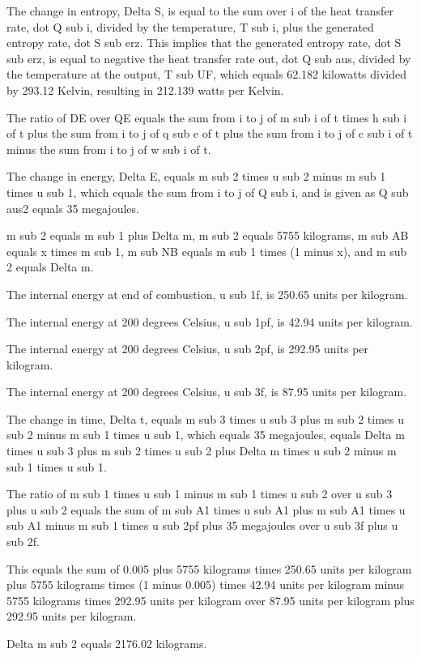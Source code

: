 The change in entropy, Delta S, is equal to the sum over i of the heat transfer rate, dot Q sub i, divided by the temperature, T sub i, plus the generated entropy rate, dot S sub erz. This implies that the generated entropy rate, dot S sub erz, is equal to negative the heat transfer rate out, dot Q sub aus, divided by the temperature at the output, T sub UF, which equals 62.182 kilowatts divided by 293.12 Kelvin, resulting in 212.139 watts per Kelvin.

The ratio of DE over QE equals the sum from i to j of m sub i of t times h sub i of t plus the sum from i to j of q sub e of t plus the sum from i to j of c sub i of t minus the sum from i to j of w sub i of t.

The change in energy, Delta E, equals m sub 2 times u sub 2 minus m sub 1 times u sub 1, which equals the sum from i to j of Q sub i, and is given as Q sub aus2 equals 35 megajoules.

m sub 2 equals m sub 1 plus Delta m, m sub 2 equals 5755 kilograms, m sub AB equals x times m sub 1, m sub NB equals m sub 1 times (1 minus x), and m sub 2 equals Delta m.

The internal energy at end of combustion, u sub 1f, is 250.65 units per kilogram.

The internal energy at 200 degrees Celsius, u sub 1pf, is 42.94 units per kilogram.

The internal energy at 200 degrees Celsius, u sub 2pf, is 292.95 units per kilogram.

The internal energy at 200 degrees Celsius, u sub 3f, is 87.95 units per kilogram.

The change in time, Delta t, equals m sub 3 times u sub 3 plus m sub 2 times u sub 2 minus m sub 1 times u sub 1, which equals 35 megajoules, equals Delta m times u sub 3 plus m sub 2 times u sub 2 plus Delta m times u sub 2 minus m sub 1 times u sub 1.

The ratio of m sub 1 times u sub 1 minus m sub 1 times u sub 2 over u sub 3 plus u sub 2 equals the sum of m sub A1 times u sub A1 plus m sub A1 times u sub A1 minus m sub 1 times u sub 2pf plus 35 megajoules over u sub 3f plus u sub 2f.

This equals the sum of 0.005 plus 5755 kilograms times 250.65 units per kilogram plus 5755 kilograms times (1 minus 0.005) times 42.94 units per kilogram minus 5755 kilograms times 292.95 units per kilogram over 87.95 units per kilogram plus 292.95 units per kilogram.

Delta m sub 2 equals 2176.02 kilograms.